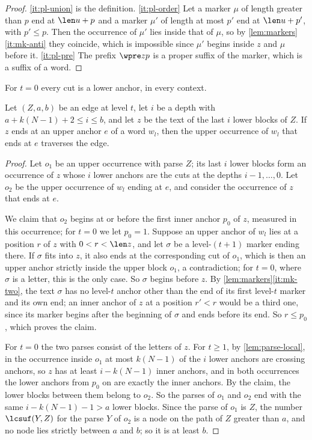 \begin{proof}
\eqref{it:pl-union} is the definition. \eqref{it:pl-order} Let a marker
$\mu$ of length greater than $p$ end at $\len u+p$ and a marker $\mu'$ of
length at most $p'$ end at $\len u+p'$, with $p'\le p$. Then the occurrence
of $\mu'$ lies inside that of $\mu$, so by
\cref{lem:markers}\eqref{it:mk-anti} they coincide, which is impossible
since $\mu'$ begins inside $z$ and $\mu$ before it.
\eqref{it:pl-pre} The prefix $\wpre zp$ is a proper suffix of the marker,
which is a suffix of a word.
\end{proof}

For $t=0$ every cut is a lower anchor, in every context.

\begin{lemma}\label{lem:traverse}
Let $(Z,a,b)$ be an edge at level $t$, let $i$ be a depth with
$a+k(N-1)+2\le i\le b$, and let $z$ be the text of the last $i$ lower blocks
of $Z$. If $z$ ends at an upper anchor $e$ of a word $w_l$, then the upper
occurrence of $w_l$ that ends at $e$ traverses the edge.
\end{lemma}

\begin{proof}
Let $o_1$ be an upper occurrence with parse $Z$; its last $i$ lower blocks
form an occurrence of $z$ whose $i$ lower anchors are the cuts at the depths
$i-1,\dots,0$. Let $o_2$ be the upper occurrence of $w_l$ ending at $e$, and
consider the occurrence of $z$ that ends at $e$.

We claim that $o_2$ begins at or before the first inner anchor $p_0$ of
$z$, measured in this occurrence; for $t=0$ we let $p_0=1$. Suppose an upper
anchor of $w_l$ lies at a position $r$ of $z$ with $0<r<\len z$, and let
$\sigma$ be a level-$(t+1)$ marker ending there. If $\sigma$ fits into $z$,
it also ends at the corresponding cut of $o_1$, which is then an upper
anchor strictly inside the upper block $o_1$, a contradiction; for $t=0$,
where $\sigma$ is a letter, this is the only case. So $\sigma$ begins before
$z$. By \cref{lem:markers}\eqref{it:mk-two}, the text $\sigma$ has no
level-$t$ anchor other than the end of its first level-$t$ marker and its
own end; an inner anchor of $z$ at a position $r'<r$ would be a third one,
since its marker begins after the beginning of $\sigma$ and ends before its
end. So $r\le p_0$, which proves the claim.

For $t=0$ the two parses consist of the letters of $z$. For $t\ge1$, by
\cref{lem:parse-local}, in the occurrence inside $o_1$ at most $k(N-1)$
of the $i$ lower anchors are crossing anchors, so $z$ has at least
$i-k(N-1)$ inner anchors, and in both occurrences the lower anchors from
$p_0$ on are exactly the inner anchors. By the claim, the lower blocks
between them belong to $o_2$. So the parses of $o_1$ and $o_2$ end with the
same $i-k(N-1)-1>a$ lower blocks. Since the parse of $o_1$ is $Z$, the
number $\lcsuf(Y,Z)$ for the parse $Y$ of $o_2$ is a node on the path of $Z$
greater than $a$, and no node lies strictly between $a$ and $b$; so it is at
least $b$.
\end{proof}


